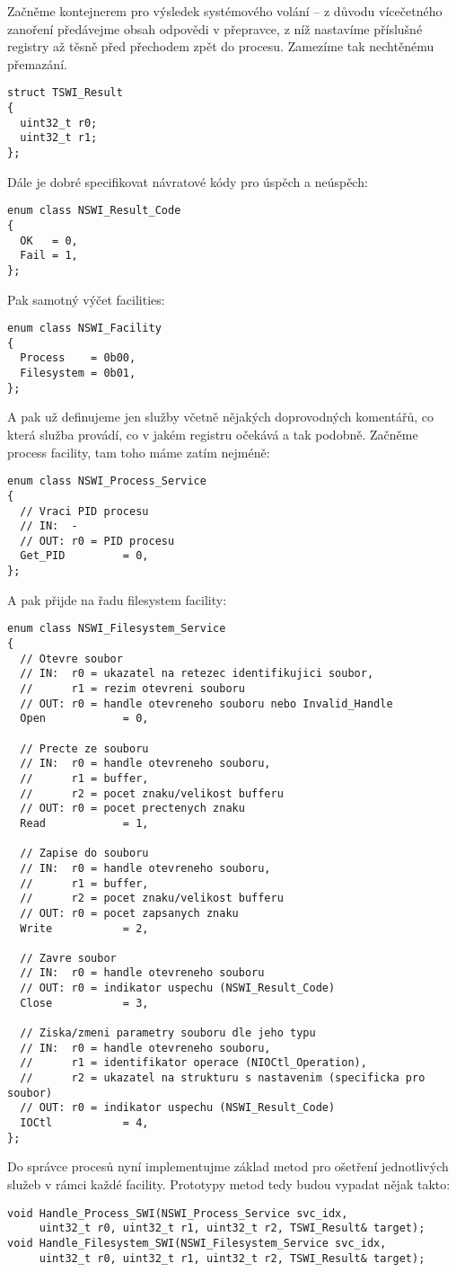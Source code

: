 \documentclass{article}
\begin{document}
Začněme kontejnerem pro výsledek systémového volání -- z důvodu vícečetného zanoření předávejme obsah odpovědi v přepravce, z níž nastavíme příslušné registry až těsně před přechodem zpět do procesu. Zamezíme tak nechtěnému přemazání.
\begin{lstlisting}
struct TSWI_Result
{
  uint32_t r0;
  uint32_t r1;
};
\end{lstlisting}
Dále je dobré specifikovat návratové kódy pro úspěch a neúspěch:
\begin{lstlisting}
enum class NSWI_Result_Code
{
  OK   = 0,
  Fail = 1,
};
\end{lstlisting}
Pak samotný výčet facilities:
\begin{lstlisting}
enum class NSWI_Facility
{
  Process    = 0b00,
  Filesystem = 0b01,
};
\end{lstlisting}
A pak už definujeme jen služby včetně nějakých doprovodných komentářů, co která služba provádí, co v jakém registru očekává a tak podobně. Začněme process facility, tam toho máme zatím nejméně:
\begin{lstlisting}
enum class NSWI_Process_Service
{
  // Vraci PID procesu
  // IN:  -
  // OUT: r0 = PID procesu
  Get_PID         = 0,
};
\end{lstlisting}
A pak přijde na řadu filesystem facility:
\begin{lstlisting}
enum class NSWI_Filesystem_Service
{
  // Otevre soubor
  // IN:  r0 = ukazatel na retezec identifikujici soubor,
  //      r1 = rezim otevreni souboru
  // OUT: r0 = handle otevreneho souboru nebo Invalid_Handle
  Open            = 0,
	
  // Precte ze souboru
  // IN:  r0 = handle otevreneho souboru,
  //      r1 = buffer,
  //      r2 = pocet znaku/velikost bufferu
  // OUT: r0 = pocet prectenych znaku
  Read            = 1,
	
  // Zapise do souboru
  // IN:  r0 = handle otevreneho souboru,
  //      r1 = buffer,
  //      r2 = pocet znaku/velikost bufferu
  // OUT: r0 = pocet zapsanych znaku
  Write           = 2,
	
  // Zavre soubor
  // IN:  r0 = handle otevreneho souboru
  // OUT: r0 = indikator uspechu (NSWI_Result_Code)
  Close           = 3,
	
  // Ziska/zmeni parametry souboru dle jeho typu
  // IN:  r0 = handle otevreneho souboru,
  //      r1 = identifikator operace (NIOCtl_Operation),
  //      r2 = ukazatel na strukturu s nastavenim (specificka pro soubor)
  // OUT: r0 = indikator uspechu (NSWI_Result_Code)
  IOCtl           = 4,
};
\end{lstlisting}
Do správce procesů nyní implementujme základ metod pro ošetření jednotlivých služeb v rámci každé facility. Prototypy metod tedy budou vypadat nějak takto:
\begin{lstlisting}
void Handle_Process_SWI(NSWI_Process_Service svc_idx,
     uint32_t r0, uint32_t r1, uint32_t r2, TSWI_Result& target);
void Handle_Filesystem_SWI(NSWI_Filesystem_Service svc_idx,
     uint32_t r0, uint32_t r1, uint32_t r2, TSWI_Result& target);
\end{lstlisting}
\end{document}

